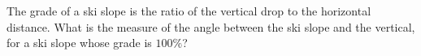 The grade of a ski slope is the ratio of the vertical drop to the horizontal distance. What is the measure of the angle between the ski slope and the vertical, for a ski slope whose grade is $100\%$?

